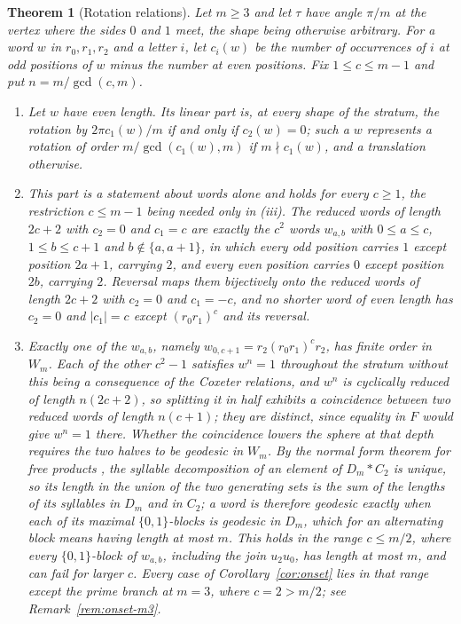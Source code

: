 \documentclass[11pt]{article}
\newtheorem{theorem}{Theorem}[section]
\theoremstyle{definition}
\theoremstyle{remark}
\begin{document}
\begin{theorem}[Rotation relations]\label{thm:rot}
Let $m\ge3$ and let $\tau$ have angle $\pi/m$ at the vertex where the sides $0$
and $1$ meet, the shape being otherwise arbitrary. For a word $w$ in
$r_0,r_1,r_2$ and a letter $i$, let $c_i(w)$ be the number of occurrences of
$i$ at odd positions of $w$ minus the number at even positions. Fix
$1\le c\le m-1$ and put $n=m/\gcd(c,m)$.
\begin{enumerate}
\item[(i)] Let $w$ have even length. Its linear part is, at every shape of the
stratum, the rotation by $2\pi c_1(w)/m$ if and only if $c_2(w)=0$; such a $w$ represents a
rotation of order $m/\gcd(c_1(w),m)$ if $m\nmid c_1(w)$, and a translation
otherwise.
\item[(ii)] This part is a statement about words alone and holds for every
$c\ge1$, the restriction $c\le m-1$ being needed only in (iii). The reduced
words of length $2c+2$ with $c_2=0$ and $c_1=c$ are
exactly the $c^2$ words $w_{a,b}$ with $0\le a\le c$, $1\le b\le c+1$ and
$b\notin\{a,a+1\}$, in which every odd position carries $1$ except position
$2a+1$, carrying $2$, and every even position carries $0$ except position
$2b$, carrying $2$. Reversal maps them bijectively onto the reduced words of
length $2c+2$ with $c_2=0$ and $c_1=-c$, and no shorter word of even length has $c_2=0$
and $|c_1|=c$ except $(r_0r_1)^c$ and its reversal.
\item[(iii)] Exactly one of the $w_{a,b}$, namely $w_{0,c+1}=r_2(r_0r_1)^cr_2$,
has finite order in $W_m$. Each of the other $c^2-1$ satisfies $w^n=1$
throughout the stratum without this being a consequence of the Coxeter
relations, and $w^n$ is cyclically reduced of length $n(2c+2)$, so splitting it in half
exhibits a coincidence between two reduced words of length $n(c+1)$; they are
distinct, since equality in $F$ would give $w^n=1$ there. Whether the
coincidence lowers the sphere at that depth requires the two halves to be
geodesic in $W_m$. By the normal form theorem for free products
\cite[Thm.~4.1]{MKS}, the syllable decomposition of an element of
$D_m*C_2$ is unique, so its length in the union of the two generating sets is
the sum of the lengths of its syllables in $D_m$ and in $C_2$; a word is
therefore geodesic exactly when each of its maximal $\{0,1\}$-blocks is
geodesic in $D_m$, which for an alternating block means having length at most
$m$. This holds in the range $c\le m/2$, where every
$\{0,1\}$-block of $w_{a,b}$, including the join $u_2u_0$, has length at most
$m$, and can fail for larger $c$. Every case of Corollary~\ref{cor:onset} lies
in that range except the prime branch at $m=3$, where $c=2>m/2$; see
Remark~\ref{rem:onset-m3}.
\end{enumerate}
\end{theorem}
\end{document}
